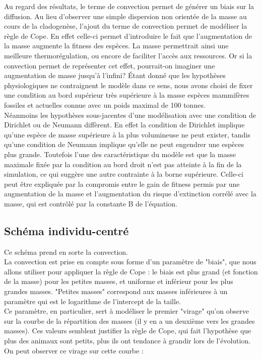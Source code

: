 \documentclass[fleqn,10pt]{SelfArx}
\begin{document}
Au regard des résultats, le terme de convection permet de générer un biais sur la diffusion. Au lieu d'observer une simple dispersion non orientée de la masse au cours de la cladogenèse, l'ajout du terme de convection permet de modéliser la règle de Cope. En effet celle-ci permet d'introduire le fait que l'augmentation de la masse augmente la fitness des espèces. La masse permettrait ainsi une meilleure thermorégulation, ou encore de faciliter l'accès aux ressources. Or si la convection permet de représenter cet effet, pourrait-on imaginer  une augmentation de masse jusqu'à l'infini? Étant donné que les hypothèses physiologiques ne contraignent le modèle dans ce sens, nous avons choisi de fixer une condition au bord supérieur très supérieure à la masse espèces mammifères fossiles et actuelles connue avec un poids maximal de 100 tonnes. \\
Néanmoins les hypothèses sous-jacentes d'une modélisation avec une condition de Dirichlet ou de Neumann diffèrent. En effet la condition de Dirichlet implique qu'une espèce de masse supérieure à la plus volumineuse ne peut exister, tandis qu'une condition de Neumann implique qu'elle ne peut engendrer une espèces plus grande. Toutefois l'une des caractéristique du modèle est que la masse maximale fixée par la condition au bord droit n'est pas atteinte à la fin de la simulation, ce qui suggère une autre contrainte à la borne supérieure. Celle-ci peut être expliquée par la compromis entre le gain de fitness permis par une augmentation de la masse et l'augmentation du risque d'extinction corrélé avec la masse, qui est contrôlé par la constante B de l'équation.  \\





\subsection*{Schéma individu-centré}
Ce schéma prend en sorte la convection.
\\La convection est prise en compte sous forme d'un paramètre de "biais", que nous allons utiliser pour appliquer la règle de Cope : le biais est plus grand (et fonction de la masse) pour les petites masses, et uniforme et inférieur pour les plus grandes masses. "Petites masses" correspond aux masses inférieures à un paramètre qui est le logarithme de l'intercept de la taille. 
\\Ce paramètre, en particulier, sert à modéliser le premier "virage" qu'on observe sur la courbe de la répartition des masses (il y en a un deuxième vers les grandes masses). Ces valeurs semblent justifier la règle de Cope, qui fait l'hypothèse que plus des animaux sont petits, plus ils ont tendance à grandir lors de l'évolution.
\\On peut observer ce virage sur cette courbe :
\end{document}
